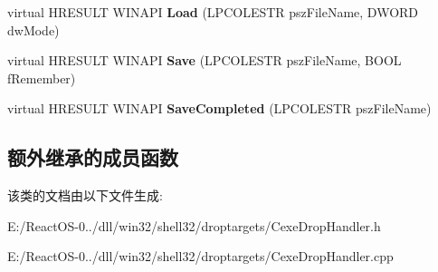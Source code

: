 \begin{DoxyCompactItemize}
virtual H\+R\+E\+S\+U\+LT W\+I\+N\+A\+PI {\bfseries Load} (L\+P\+C\+O\+L\+E\+S\+TR psz\+File\+Name, D\+W\+O\+RD dw\+Mode)
\item 
\mbox{\label{class_c_exe_drop_handler_a4c4f89f7a7976747cd96be99dea6629d}} 
virtual H\+R\+E\+S\+U\+LT W\+I\+N\+A\+PI {\bfseries Save} (L\+P\+C\+O\+L\+E\+S\+TR psz\+File\+Name, B\+O\+OL f\+Remember)
\item 
\mbox{\label{class_c_exe_drop_handler_ad55dadfc2746ee6305ab1f58db9f1abe}} 
virtual H\+R\+E\+S\+U\+LT W\+I\+N\+A\+PI {\bfseries Save\+Completed} (L\+P\+C\+O\+L\+E\+S\+TR psz\+File\+Name)
\end{DoxyCompactItemize}
\subsection*{额外继承的成员函数}


该类的文档由以下文件生成\+:\begin{DoxyCompactItemize}
\item 
E\+:/\+React\+O\+S-\/0../dll/win32/shell32/droptargets/Cexe\+Drop\+Handler.\+h\item 
E\+:/\+React\+O\+S-\/0../dll/win32/shell32/droptargets/Cexe\+Drop\+Handler.\+cpp\end{DoxyCompactItemize}
